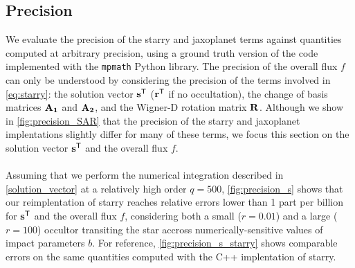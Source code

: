 \documentclass[modern]{aastex631}
\begin{document}
\subsection{Precision}\label{precision}
We evaluate the precision of the \textsf{starry} and \textsf{jaxoplanet} terms against quantities computed at arbitrary precision, using a ground truth version of the code implemented with the \texttt{mpmath} Python library. The precision of the overall flux $f$ can only be understood by considering the precision of the terms involved in \autoref{eq:starry}: the solution vector ${\mathbf{s}}^\mathsf{T}$ (${\mathbf{r}}^\mathsf{T}$ if no occultation), the change of basis matrices ${\mathbf{A_1}}$ and ${\mathbf{A_2}}$, and the Wigner-D rotation matrix ${\mathbf{R}}$. Although we show in \autoref{fig:precision_SAR} that the precision of the \textsf{starry} and \textsf{jaxoplanet} implentations slightly differ for many of these terms, we focus this section on the solution vector ${\mathbf{s}}^\mathsf{T}$ and the overall flux $f$.\\\\
Assuming that we perform the numerical integration described in \autoref{solution_vector} at a relatively high order $q=500$, \autoref{fig:precision_s} shows that our reimplentation of \textsf{starry} reaches relative errors lower than 1 part per billion for ${\mathbf{s}}^\mathsf{T}$ and the overall flux $f$, considering both a small ($r=0.01$) and a large ($r=100$) occultor transiting the star accross numerically-sensitive values of impact parameters $b$. For reference, \autoref{fig:precision_s_starry} shows comparable errors on the same quantities computed with the C++ implentation of \textsf{starry}. 
\end{document}
